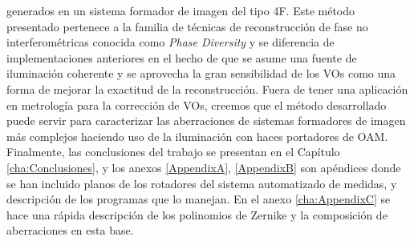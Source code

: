 generados en un sistema formador de imagen del tipo 4F. Este método
presentado pertenece a la familia de técnicas de reconstrucción de
fase no interferométricas conocida como \textit{Phase Diversity} y se
diferencia de implementaciones anteriores en el hecho de que se asume
una fuente de iluminación coherente y se aprovecha la gran
sensibilidad de los VOs como una forma de mejorar la exactitud de la
reconstrucción. 
Fuera de tener una aplicación en metrología para la corrección de VOs,
creemos que el método desarrollado puede servir para caracterizar las
aberraciones de sistemas formadores de imagen más complejos haciendo
uso de la iluminación con haces portadores de OAM. 
Finalmente, las conclusiones del trabajo se presentan en el Capítulo
\ref{cha:Conclusiones}, y los anexos \ref{AppendixA}, \ref{AppendixB}
 son apéndices donde se han incluido planos de los
rotadores del sistema automatizado de medidas, y descripción de los
programas que lo manejan. En el anexo \ref{cha:AppendixC} se hace una rápida
descripción de los polinomios de Zernike y la composición de
aberraciones en esta base. 

\newpage
\pagebreak[4]






